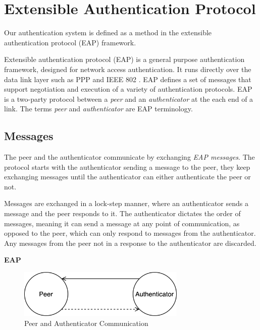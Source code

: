\section{Extensible Authentication Protocol}
\label{section:eap}
Our authentication system is defined as a method in the extensible authentication protocol (EAP) framework.


Extensible authentication protocol \cite{aboba2004extensible} (EAP) is a general purpose authentication framework, designed for network access authentication. 
It runs directly over the data link layer such as PPP  \cite{simpson1994rfc1661} and IEEE 802 \cite{walke2007ieee}.
EAP defines a set of messages that support negotiation and execution of a variety of authentication protocols.
EAP is a two-party protocol between a \textit{peer} and an \textit{authenticator} at the each end of a link. The terms \textit{peer} and \textit{authenticator} are EAP terminology.

\subsection{Messages}
The peer and the authenticator communicate by exchanging \textit{EAP messages}.
The protocol starts with the authenticator sending a message to the peer, they keep exchanging messages until the authenticator can either authenticate the peer or not.

Messages are exchanged in a lock-step manner, where an authenticator sends a message and the peer responds to it. 
The authenticator dictates the order of messages, meaning it can send a message at any point of communication, as opposed to the peer, which can only respond to messages from the authenticator.
Any messages from the peer not in a response to the authenticator are discarded.
\bigskip
\begin{center}
	\textbf{EAP}
\end{center}
\begin{figure}[h]
	\centering
	\includegraphics[width=8cm]{images/eap-messages}
	\caption{Peer and Authenticator Communication}
	\label{fig:eap-messages}
\end{figure}

